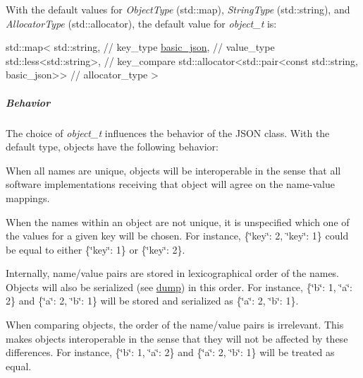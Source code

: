 With the default values for {\itshape Object\+Type} ({\ttfamily std\+::map}), {\itshape String\+Type} ({\ttfamily std\+::string}), and {\itshape Allocator\+Type} ({\ttfamily std\+::allocator}), the default value for {\itshape object\+\_\+t} is\+:


\begin{DoxyCode}
std::map<
  std::string, \textcolor{comment}{// key\_type}
  \hyperlink{classnlohmann_1_1basic__json_aed115142bd0c6c66c864700e0467df55}{basic\_json}, \textcolor{comment}{// value\_type}
  std::less<std::string>, \textcolor{comment}{// key\_compare}
  std::allocator<std::pair<const std::string, basic\_json>> \textcolor{comment}{// allocator\_type}
>
\end{DoxyCode}


\subparagraph*{Behavior}

The choice of {\itshape object\+\_\+t} influences the behavior of the J\+S\+ON class. With the default type, objects have the following behavior\+:


\begin{DoxyItemize}
\item When all names are unique, objects will be interoperable in the sense that all software implementations receiving that object will agree on the name-\/value mappings.
\item When the names within an object are not unique, it is unspecified which one of the values for a given key will be chosen. For instance, {\ttfamily \{\char`\"{}key\char`\"{}\+: 2, \char`\"{}key\char`\"{}\+: 1\}} could be equal to either {\ttfamily \{\char`\"{}key\char`\"{}\+: 1\}} or {\ttfamily \{\char`\"{}key\char`\"{}\+: 2\}}.
\item Internally, name/value pairs are stored in lexicographical order of the names. Objects will also be serialized (see \hyperlink{classnlohmann_1_1basic__json_a5adea76fedba9898d404fef8598aa663}{dump}) in this order. For instance, {\ttfamily \{\char`\"{}b\char`\"{}\+: 1, \char`\"{}a\char`\"{}\+: 2\}} and {\ttfamily \{\char`\"{}a\char`\"{}\+: 2, \char`\"{}b\char`\"{}\+: 1\}} will be stored and serialized as {\ttfamily \{\char`\"{}a\char`\"{}\+: 2, \char`\"{}b\char`\"{}\+: 1\}}.
\item When comparing objects, the order of the name/value pairs is irrelevant. This makes objects interoperable in the sense that they will not be affected by these differences. For instance, {\ttfamily \{\char`\"{}b\char`\"{}\+: 1, \char`\"{}a\char`\"{}\+: 2\}} and {\ttfamily \{\char`\"{}a\char`\"{}\+: 2, \char`\"{}b\char`\"{}\+: 1\}} will be treated as equal.
\end{DoxyItemize}

